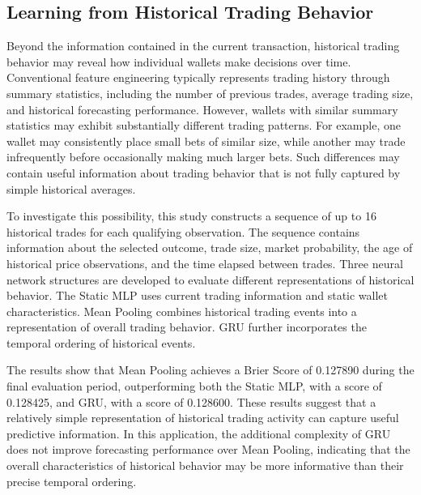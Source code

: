 
\subsection{Learning from Historical Trading Behavior}

Beyond the information contained in the current transaction, historical trading behavior may reveal how individual wallets make decisions over time. Conventional feature engineering typically represents trading history through summary statistics, including the number of previous trades, average trading size, and historical forecasting performance. However, wallets with similar summary statistics may exhibit substantially different trading patterns. For example, one wallet may consistently place small bets of similar size, while another may trade infrequently before occasionally making much larger bets. Such differences may contain useful information about trading behavior that is not fully captured by simple historical averages.

To investigate this possibility, this study constructs a sequence of up to 16 historical trades for each qualifying observation. The sequence contains information about the selected outcome, trade size, market probability, the age of historical price observations, and the time elapsed between trades. Three neural network structures are developed to evaluate different representations of historical behavior. The Static MLP uses current trading information and static wallet characteristics. Mean Pooling combines historical trading events into a representation of overall trading behavior. GRU further incorporates the temporal ordering of historical events.

The results show that Mean Pooling achieves a Brier Score of 0.127890 during the final evaluation period, outperforming both the Static MLP, with a score of 0.128425, and GRU, with a score of 0.128600. These results suggest that a relatively simple representation of historical trading activity can capture useful predictive information. In this application, the additional complexity of GRU does not improve forecasting performance over Mean Pooling, indicating that the overall characteristics of historical behavior may be more informative than their precise temporal ordering.

